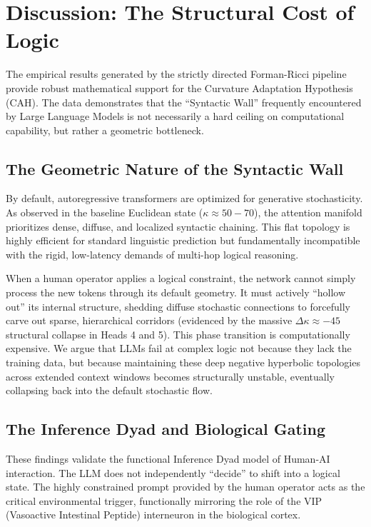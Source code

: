 \documentclass[11pt, a4paper]{article}
\begin{document}
\section{Discussion: The Structural Cost of Logic}
The empirical results generated by the strictly directed Forman-Ricci pipeline provide robust mathematical support for the Curvature Adaptation Hypothesis (CAH). The data demonstrates that the ``Syntactic Wall'' frequently encountered by Large Language Models is not necessarily a hard ceiling on computational capability, but rather a geometric bottleneck.

\subsection{The Geometric Nature of the Syntactic Wall}
By default, autoregressive transformers are optimized for generative stochasticity. As observed in the baseline Euclidean state ($\kappa \approx 50-70$), the attention manifold prioritizes dense, diffuse, and localized syntactic chaining. This flat topology is highly efficient for standard linguistic prediction but fundamentally incompatible with the rigid, low-latency demands of multi-hop logical reasoning.

When a human operator applies a logical constraint, the network cannot simply process the new tokens through its default geometry. It must actively ``hollow out'' its internal structure, shedding diffuse stochastic connections to forcefully carve out sparse, hierarchical corridors (evidenced by the massive $\Delta\kappa \approx -45$ structural collapse in Heads 4 and 5). This phase transition is computationally expensive. We argue that LLMs fail at complex logic not because they lack the training data, but because maintaining these deep negative hyperbolic topologies across extended context windows becomes structurally unstable, eventually collapsing back into the default stochastic flow.

\subsection{The Inference Dyad and Biological Gating}
These findings validate the functional Inference Dyad model of Human-AI interaction. The LLM does not independently ``decide'' to shift into a logical state. The highly constrained prompt provided by the human operator acts as the critical environmental trigger, functionally mirroring the role of the VIP (Vasoactive Intestinal Peptide) interneuron in the biological cortex.
\end{document}
